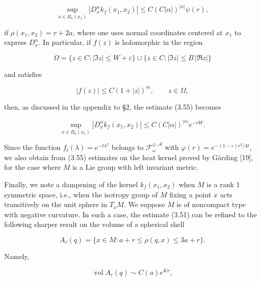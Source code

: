 \begin{equation}\tag{3.55}
\sup_{x\in B_a(x_1)} |D_x^\alpha k_f(x_1,x_2)| \le C(C|\alpha|)^{|\alpha|}\psi(r),
\end{equation}

if $\rho(x_1,x_2)=r+2a$, where one uses normal coordinates centered at $x_1$ to express $D_x^\alpha$. In particular, if $f(z)$ is holomorphic in the region

\begin{equation}\tag{3.56}
\Omega = \{z\in C: |\Im z|\le W+\varepsilon\}\cup\{z\in C: |\Im z|\le B\, |\Re z|\}
\end{equation}

and satisfies

\begin{equation}\tag{3.57}
|f(z)|\le C(1+|z|)^m, \qquad z\in \Omega,
\end{equation}

then, as discussed in the appendix to \S2, the estimate (3.55) becomes

\begin{equation}\tag{3.58}
\sup_{x\in B_a(x_1)} |D_x^\alpha k_f(x_1,x_2)| \le C(C|\alpha|)^{|\alpha|} e^{-rW}.
\end{equation}

Since the function $f_t(\lambda)=e^{-t\lambda^2}$ belongs to $\mathcal F_\omega^{\varphi,\mathcal A}$ with $\varphi(r)=e^{-(1-\varepsilon)r^2/4t}$, we also obtain from (3.55) estimates on the heat kernel proved by G\aa rding [19], for the case where $M$ is a Lie group with left invariant metric.

Finally, we note a dampening of the kernel $k_f(x_1,x_2)$ when $M$ is a rank 1 symmetric space, i.e., when the isotropy group of $M$ fixing a point $x$ acts transitively on the unit sphere in $T_xM$. We suppose $M$ is of noncompact type with negative curvature. In such a case, the estimate (3.51) can be refined to the following sharper result on the volume of a spherical shell

\begin{equation}\tag{3.59}
A_r(q) = \{x\in M: a+r\le \rho(q,x)\le 3a+r\}.
\end{equation}

Namely,

\begin{equation}\tag{3.60}
\operatorname{vol} A_r(q) \sim C(a)e^{Kr},
\end{equation}

